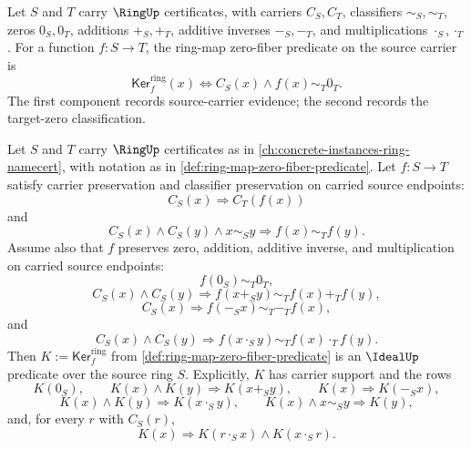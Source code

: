 \begin{definition}
\label{def:ring-map-zero-fiber-predicate}
Let $S$ and $T$ carry $\RingUp$ certificates, with carriers $C_S,C_T$, classifiers $\sim_S,\sim_T$, zeros $0_S,0_T$, additions $+_S,+_T$, additive inverses $-_S,-_T$, and multiplications $\cdot_S,\cdot_T$. For a function $f:S\to T$, the ring-map zero-fiber predicate on the source carrier is
$$
\mathsf{Ker}^{\mathrm{ring}}_f(x)\Longleftrightarrow C_S(x)\land f(x)\sim_T0_T.
$$
The first component records source-carrier evidence; the second records the target-zero classification.
\end{definition}

\begin{theorem}
\label{thm:ring-map-zero-fiber-ideal-closure}
Let $S$ and $T$ carry $\RingUp$ certificates as in \autoref{ch:concrete-instances-ring-namecert}, with notation as in \autoref{def:ring-map-zero-fiber-predicate}. Let $f:S\to T$ satisfy carrier preservation and classifier preservation on carried source endpoints:
$$
C_S(x)\Longrightarrow C_T(f(x))
$$
and
$$
C_S(x)\land C_S(y)\land x\sim_S y\Longrightarrow f(x)\sim_T f(y).
$$
Assume also that $f$ preserves zero, addition, additive inverse, and multiplication on carried source endpoints:
$$
f(0_S)\sim_T0_T,
$$
$$
C_S(x)\land C_S(y)\Longrightarrow f(x+_S y)\sim_T f(x)+_T f(y),
$$
$$
C_S(x)\Longrightarrow f(-_S x)\sim_T -_T f(x),
$$
and
$$
C_S(x)\land C_S(y)\Longrightarrow f(x\cdot_S y)\sim_T f(x)\cdot_T f(y).
$$
Then $K:=\mathsf{Ker}^{\mathrm{ring}}_f$ from \autoref{def:ring-map-zero-fiber-predicate} is an $\IdealUp$ predicate over the source ring $S$. Explicitly, $K$ has carrier support and the rows
$$
K(0_S),\qquad K(x)\land K(y)\Longrightarrow K(x+_S y),\qquad K(x)\Longrightarrow K(-_S x),
$$
$$
K(x)\land K(y)\Longrightarrow K(x\cdot_S y),\qquad K(x)\land x\sim_S y\Longrightarrow K(y),
$$
and, for every $r$ with $C_S(r)$,
$$
K(x)\Longrightarrow K(r\cdot_S x)\land K(x\cdot_S r).
$$
\end{theorem}
